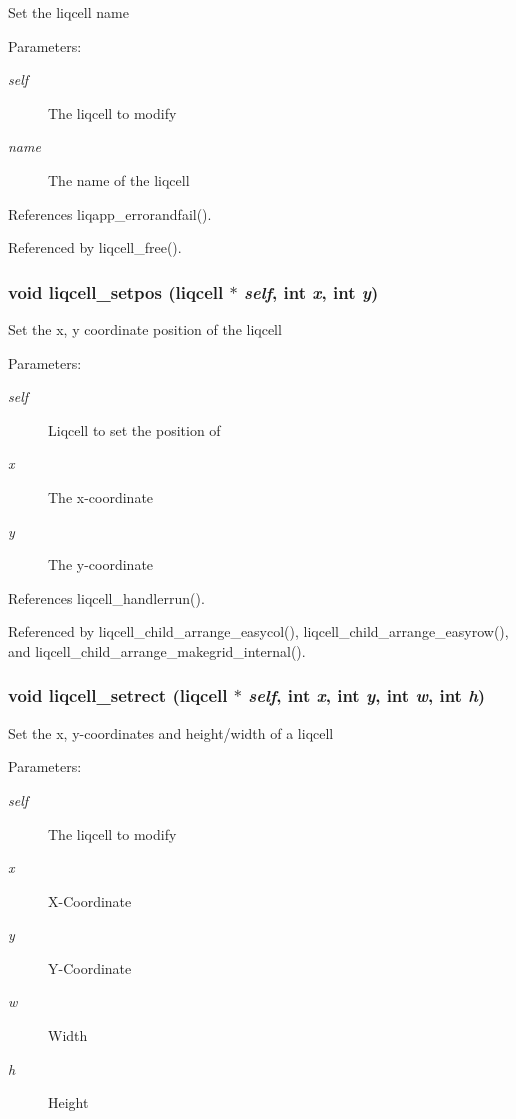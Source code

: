 Set the liqcell name \begin{Desc}
\item[Parameters:]
\begin{description}
\item[{\em self}]The liqcell to modify \item[{\em name}]The name of the liqcell \end{description}
\end{Desc}


References liqapp\_\-errorandfail().

Referenced by liqcell\_\-free().
\subsubsection[{liqcell\_\-setpos}]{\setlength{\rightskip}{0pt plus 5cm}void liqcell\_\-setpos (liqcell $\ast$ {\em self}, \/  int {\em x}, \/  int {\em y})}\label{d5/da2/liqcell_8c_29c63f821be5a97c33041c3f977756ab}


Set the x, y coordinate position of the liqcell \begin{Desc}
\item[Parameters:]
\begin{description}
\item[{\em self}]Liqcell to set the position of \item[{\em x}]The x-coordinate \item[{\em y}]The y-coordinate \end{description}
\end{Desc}


References liqcell\_\-handlerrun().

Referenced by liqcell\_\-child\_\-arrange\_\-easycol(), liqcell\_\-child\_\-arrange\_\-easyrow(), and liqcell\_\-child\_\-arrange\_\-makegrid\_\-internal().
\subsubsection[{liqcell\_\-setrect}]{\setlength{\rightskip}{0pt plus 5cm}void liqcell\_\-setrect (liqcell $\ast$ {\em self}, \/  int {\em x}, \/  int {\em y}, \/  int {\em w}, \/  int {\em h})}\label{d5/da2/liqcell_8c_96002145228977f59beff1bcdd4b7267}


Set the x, y-coordinates and height/width of a liqcell \begin{Desc}
\item[Parameters:]
\begin{description}
\item[{\em self}]The liqcell to modify \item[{\em x}]X-Coordinate \item[{\em y}]Y-Coordinate \item[{\em w}]Width \item[{\em h}]Height \end{description}
\end{Desc}



